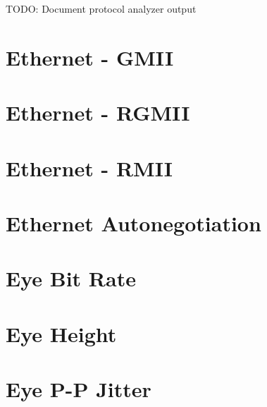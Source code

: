 TODO: Document protocol analyzer output

\pagebreak
\section{Ethernet - GMII}

\pagebreak
\section{Ethernet - RGMII}

\pagebreak
\section{Ethernet - RMII}

\pagebreak
\section{Ethernet Autonegotiation}

\pagebreak
\section{Eye Bit Rate}

\pagebreak
\section{Eye Height}

\pagebreak
\section{Eye P-P Jitter}

\pagebreak
